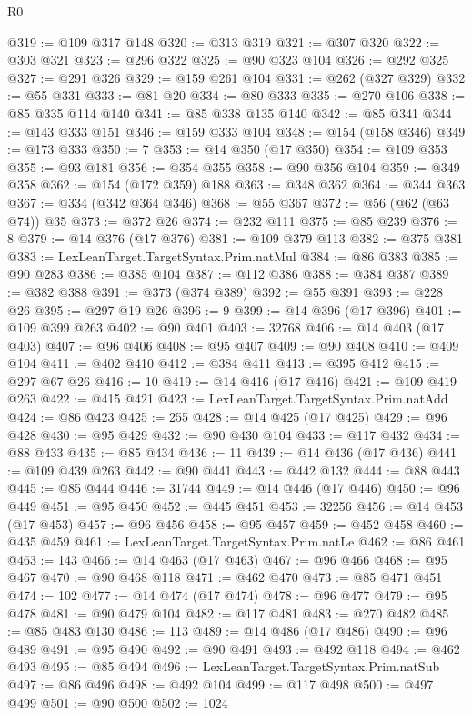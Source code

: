 \begin{lexlean}{R0}
\begin{coremodule}
@319 := @109 @317 @148
@320 := @313 @319
@321 := @307 @320
@322 := @303 @321
@323 := @296 @322
@325 := @90 @323 @104
@326 := @292 @325
@327 := @291 @326
@329 := @159 @261 @104
@331 := @262 (@327 @329)
@332 := @55 @331
@333 := @81 @20
@334 := @80 @333
@335 := @270 @106
@338 := @85 @335 @114 @140
@341 := @85 @338 @135 @140
@342 := @85 @341
@344 := @143 @333 @151
@346 := @159 @333 @104
@348 := @154 (@158 @346)
@349 := @173 @333
@350 := 7
@353 := @14 @350 (@17 @350)
@354 := @109 @353
@355 := @93 @181
@356 := @354 @355
@358 := @90 @356 @104
@359 := @349 @358
@362 := @154 (@172 @359) @188
@363 := @348 @362
@364 := @344 @363
@367 := @334 (@342 @364 @346)
@368 := @55 @367
@372 := @56 (@62 (@63 @74)) @35
@373 := @372 @26
@374 := @232 @111
@375 := @85 @239
@376 := 8
@379 := @14 @376 (@17 @376)
@381 := @109 @379 @113
@382 := @375 @381
@383 := LexLeanTarget.TargetSyntax.Prim.natMul
@384 := @86 @383
@385 := @90 @283
@386 := @385 @104
@387 := @112 @386
@388 := @384 @387
@389 := @382 @388
@391 := @373 (@374 @389)
@392 := @55 @391
@393 := @228 @26
@395 := @297 @19 @26
@396 := 9
@399 := @14 @396 (@17 @396)
@401 := @109 @399 @263
@402 := @90 @401
@403 := 32768
@406 := @14 @403 (@17 @403)
@407 := @96 @406
@408 := @95 @407
@409 := @90 @408
@410 := @409 @104
@411 := @402 @410
@412 := @384 @411
@413 := @395 @412
@415 := @297 @67 @26
@416 := 10
@419 := @14 @416 (@17 @416)
@421 := @109 @419 @263
@422 := @415 @421
@423 := LexLeanTarget.TargetSyntax.Prim.natAdd
@424 := @86 @423
@425 := 255
@428 := @14 @425 (@17 @425)
@429 := @96 @428
@430 := @95 @429
@432 := @90 @430 @104
@433 := @117 @432
@434 := @88 @433
@435 := @85 @434
@436 := 11
@439 := @14 @436 (@17 @436)
@441 := @109 @439 @263
@442 := @90 @441
@443 := @442 @132
@444 := @88 @443
@445 := @85 @444
@446 := 31744
@449 := @14 @446 (@17 @446)
@450 := @96 @449
@451 := @95 @450
@452 := @445 @451
@453 := 32256
@456 := @14 @453 (@17 @453)
@457 := @96 @456
@458 := @95 @457
@459 := @452 @458
@460 := @435 @459
@461 := LexLeanTarget.TargetSyntax.Prim.natLe
@462 := @86 @461
@463 := 143
@466 := @14 @463 (@17 @463)
@467 := @96 @466
@468 := @95 @467
@470 := @90 @468 @118
@471 := @462 @470
@473 := @85 @471 @451
@474 := 102
@477 := @14 @474 (@17 @474)
@478 := @96 @477
@479 := @95 @478
@481 := @90 @479 @104
@482 := @117 @481
@483 := @270 @482
@485 := @85 @483 @130
@486 := 113
@489 := @14 @486 (@17 @486)
@490 := @96 @489
@491 := @95 @490
@492 := @90 @491
@493 := @492 @118
@494 := @462 @493
@495 := @85 @494
@496 := LexLeanTarget.TargetSyntax.Prim.natSub
@497 := @86 @496
@498 := @492 @104
@499 := @117 @498
@500 := @497 @499
@501 := @90 @500
@502 := 1024

\end{coremodule}
\end{lexlean}
